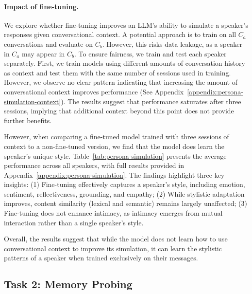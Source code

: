 \paragraph{Impact of fine-tuning.} 
We explore whether fine-tuning improves an LLM’s ability to simulate a speaker’s responses given conversational context.
A potential approach is to train on all \( C_a \) conversations and evaluate on \( C_b \).  
However, this risks data leakage, as a speaker in \( C_a \) may appear in \( C_b \).  
To ensure fairness, we train and test each speaker separately.  
First, we train models using different amounts of conversation history as context and test them with the same number of sessions used in training.
However, we observe no clear pattern indicating that increasing the amount of conversational context improves performance (See Appendix~\ref{appendix:persona-simulation-context}).
The results suggest that performance saturates after three sessions, implying that additional context beyond this point does not provide further benefits.

However, when comparing a fine-tuned model trained with three sessions of context to a non-fine-tuned version, we find that the model does learn the speaker’s unique style.
Table~\ref{tab:persona-simulation} presents the average performance across all speakers, with full results provided in Appendix~\ref{appendix:persona-simulation}. 
The findings highlight three key insights:
(1) Fine-tuning effectively captures a speaker’s style, including emotion, sentiment, reflectiveness, grounding, and empathy; 
(2) While stylistic adaptation improves, content similarity (lexical and semantic) remains largely unaffected;  
(3) Fine-tuning does not enhance intimacy, as intimacy emerges from mutual interaction rather than a single speaker’s style.

Overall, the results suggest that while the model does not learn how to use conversational context to improve its simulation, it can learn the stylistic patterns of a speaker when trained exclusively on their messages.






\subsection{Task 2: Memory Probing}  
\label{ssec:memory-probing}  

